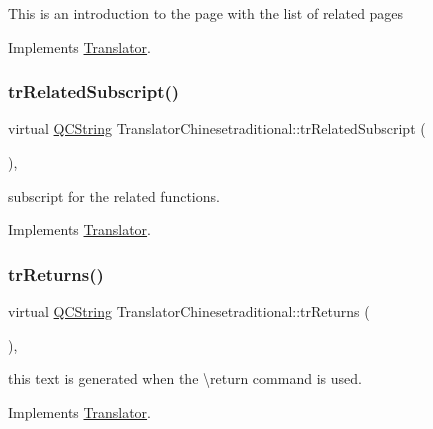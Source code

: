 This is an introduction to the page with the list of related pages 

Implements \mbox{\hyperlink{class_translator}{Translator}}.

\mbox{\label{class_translator_chinesetraditional_a1e290a366815e1a6f81ab8f7ecb0e860}} 
\subsubsection{\texorpdfstring{trRelatedSubscript()}{trRelatedSubscript()}}
{\footnotesize\ttfamily virtual \mbox{\hyperlink{class_q_c_string}{Q\+C\+String}} Translator\+Chinesetraditional\+::tr\+Related\+Subscript (\begin{DoxyParamCaption}{ }\end{DoxyParamCaption})\hspace{0.3cm}{\ttfamily [inline]}, {\ttfamily [virtual]}}

subscript for the related functions. 

Implements \mbox{\hyperlink{class_translator}{Translator}}.

\mbox{\label{class_translator_chinesetraditional_ad88945dcceb6d0e446b8ff4e2767133a}} 
\subsubsection{\texorpdfstring{trReturns()}{trReturns()}}
{\footnotesize\ttfamily virtual \mbox{\hyperlink{class_q_c_string}{Q\+C\+String}} Translator\+Chinesetraditional\+::tr\+Returns (\begin{DoxyParamCaption}{ }\end{DoxyParamCaption})\hspace{0.3cm}{\ttfamily [inline]}, {\ttfamily [virtual]}}

this text is generated when the \textbackslash{}return command is used. 

Implements \mbox{\hyperlink{class_translator}{Translator}}.

